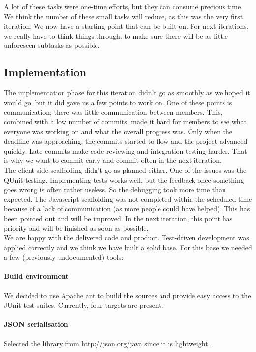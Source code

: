 \documentclass[a4paper]{article}
\begin{document}
A lot of these tasks were one-time efforts, but they can consume precious time. We think the number of these small tasks will reduce, as this was the very first iteration. We now have a starting point that can be built on. For next iterations, we really have to think things through, to make sure there will be as little unforeseen subtasks as possible.

\pagebreak
\subsection{Implementation}
The implementation phase for this iteration didn't go as smoothly as we hoped it would go, but it did gave us a few points to work on. One of these points is communication; there was little communication between members. This, combined with a low number of commits, made it hard for members to see what everyone was working on and what the overall progress was. Only when the deadline was approaching, the commits started to flow and the project advanced quickly.
Late commits make code reviewing and integration testing harder. That is why we want to commit early and commit often in the next iteration.\\

The client-side scaffolding didn't go as planned either. One of the issues was the QUnit testing. Implementing tests works well, but the feedback once something goes wrong is often rather useless. So the debugging took more time than expected. The Javascript scaffolding was not completed within the scheduled time because of a lack of communication (as more people could have helped). This has been pointed out and will be improved. In the next iteration, this point has priority and will be finished as soon as possible.\\

We are happy with the delivered code and product. Test-driven development was applied correctly and we think we have built a solid base. For this base we needed a few (previously undocumented) tools:

\paragraph{Build environment}
We decided to use Apache ant to build the sources and provide easy access to the JUnit test suites. Currently, four targets are present.

\paragraph{JSON serialisation}
Selected the library from \url{http://json.org/java} since it is lightweight.
\end{document}
